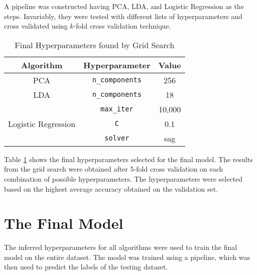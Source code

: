 \documentclass[conference]{IEEEtran}
\begin{document}
    A pipeline was constructed having PCA, LDA, and Logistic Regression as the steps.
    Invariably, they were tested with different lists of hyperparameters and cross validated using $k$-fold cross validation technique.

    \begin{table}[htbp]
        \caption{Final Hyperparameters found by Grid Search}
        \begin{center}
            \begin{tabular}{|c|c|c|}
                \hline
                \textbf{Algorithm} & \textbf{Hyperparameter} & \textbf{Value} \\
                \hline
                PCA & \texttt{n\_components} & 256 \\
                \hline
                LDA & \texttt{n\_components} & 18 \\
                \hline
                 & \texttt{max\_iter} & 10,000 \\
                \cline{2-3}
                Logistic Regression & \texttt{C} & 0.1 \\
                \cline{2-3}
                & \texttt{solver} & sag \\
                \hline
            \end{tabular}
            \label{tab:hyperparams}
        \end{center}
    \end{table}

    Table \ref{tab:hyperparams} shows the final hyperparameters selected for the final model.
    The results from the grid search were obtained after 5-fold cross validation on each combination of possible hyperparameters.
    The hyperparameters were selected based on the highest average accuracy obtained on the validation set.

    \section{The Final Model}
    \label{sec:finalmodel}
    The inferred hyperparameters for all algorithms were used to train the final model on the entire dataset.
    The model was trained using a pipeline, which was then used to predict the labels of the testing dataset. \\
    \vspace*{10pt}
\end{document}
